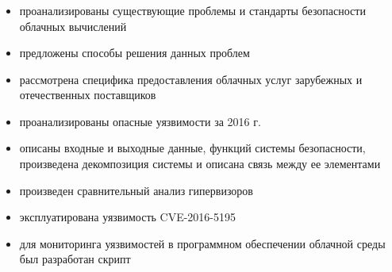 \begin{frame}
\frametitle{\insertsection}

\begin{itemize}
    \item проанализированы существующие проблемы и стандарты безопасности облачных вычислений
    \item предложены способы решения данных проблем
    \item рассмотрена специфика предоставления облачных услуг зарубежных и отечественных поставщиков
    \item проанализированы опасные уязвимости за 2016 г.
    \item описаны входные и выходные данные, функций системы безопасности, произведена декомпозиция системы и описана связь между ее элементами
    \item произведен сравнительный анализ гипервизоров
    \item эксплуатирована уязвимость CVE-2016-5195
    \item для мониторинга уязвимостей в программном обеспечении облачной среды был разработан скрипт
\end{itemize}
\end{frame}
